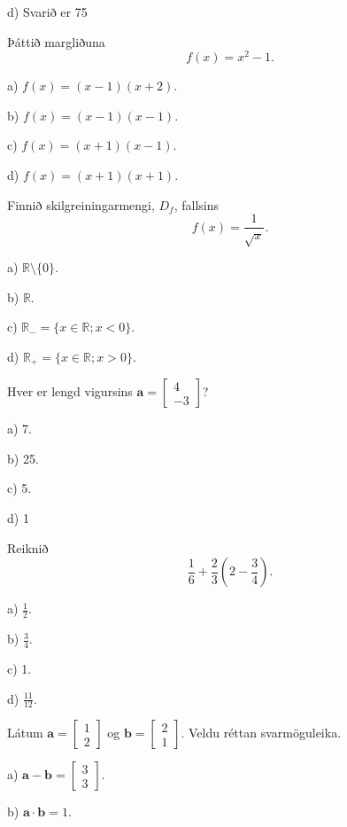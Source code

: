 d) Svarið er 75 %


\item Þáttið margliðuna $$f(x) = x^2 -1.$$

a) $f(x) = (x-1)(x+2)$.

b) $f(x) = (x-1)(x-1)$.

c) $f(x) = (x+1)(x-1)$. %

d) $f(x) = (x+1)(x+1)$.


\item Finnið skilgreiningarmengi, $D_f$, fallsins $$f(x) = \frac{1}{\sqrt x}.$$

a) $\mathbb{R} \setminus \{0\}$.

b) $\mathbb{R}$.

c) $\mathbb{R}_- = \{ x \in \mathbb{R} ; x<0\}$.

d) $\mathbb{R}_+ = \{ x \in \mathbb{R} ; x>0\}$. %


\item Hver er lengd vigursins $ \mathbf{a} =
\left[
\begin{matrix}
4\\
-3
\end{matrix}
\right]$?

a) 7.

b) 25.

c) 5. %

d) 1


\item Reiknið
\[
\frac{1}{6} + \frac{2}{3} \left( 2 - \frac{3}{4} \right).
\]

a) $ \frac{1}{2}$.

b) $ \frac{3}{4}$.

c) 1. %

d) $ \frac{11}{12}$.


\item Látum $ \mathbf{a} =
\left[
\begin{matrix}
1\\
2
\end{matrix}
\right]
$
og
$
\mathbf{b} =
\left[
\begin{matrix}
2\\
1
\end{matrix}
\right]
$.
Veldu réttan svarmöguleika.

a) $ \mathbf{a} - \mathbf{b} = \left[  \begin{matrix} 3 \\ 3 \end{matrix} \right] $.

b) $ \mathbf{a} \cdot \mathbf{b} = 1$.

